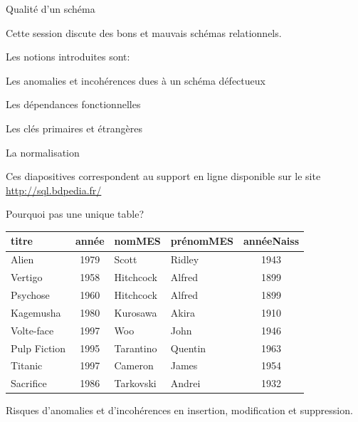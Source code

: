 
\begin{frame}[fragile]{Qualité d'un schéma}

Cette session discute des bons et mauvais schémas relationnels. 

\vfill

Les notions
introduites sont:

\begin{redbullet}
  \item Les anomalies et incohérences dues à un schéma défectueux
  \item Les dépendances fonctionnelles
  \item Les clés primaires et étrangères
  \item La \alert{normalisation} 
\end{redbullet}

\vfill
\begin{blocgauche}
\alert{Ces diapositives correspondent au support en ligne disponible sur
le site \url{http://sql.bdpedia.fr/}}
\end{blocgauche}

\end{frame}


\begin{frame}{Pourquoi pas une unique table?}

\begin{small}
\begin{center}
\begin{tabular}{l|c|l|l|c}
 titre &  année &  nomMES &  prénomMES &  annéeNaiss \\
\hline
Alien & 1979 & Scott & Ridley & 1943\\
Vertigo  & 1958 & Hitchcock & Alfred & 1899\\
Psychose & 1960 & Hitchcock & Alfred & 1899\\
Kagemusha & 1980 & Kurosawa & Akira & 1910\\
Volte-face & 1997 & Woo & John & 1946\\
Pulp Fiction & 1995 & Tarantino & Quentin & 1963 \\
Titanic & 1997 & Cameron & James & 1954\\
Sacrifice & 1986 & Tarkovski & Andrei &1932\\
\hline
\end{tabular}
\end{center}
\end{small}

\vfill

Risques d'anomalies et d'incohérences en \alert{insertion}, \alert{modification}
et \alert{suppression}. 
\end{frame}



